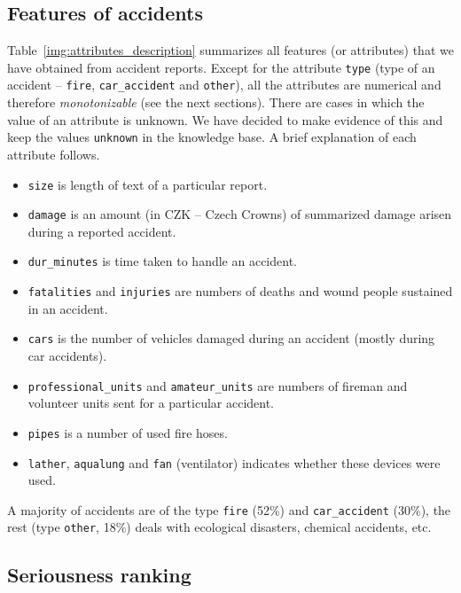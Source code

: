 \subsection{Features of accidents} \label{sec:features}


Table~\ref{img:attributes_description} summarizes all features (or attributes) that we have obtained from accident reports. Except for the attribute \verb+type+ (type of an accident -- \verb+fire+, \verb+car_accident+ and \verb+other+), all the attributes are numerical and therefore \emph{monotonizable} (see the next sections). There are cases in which the value of an attribute is unknown. We have decided to make evidence of this and keep the values \verb+unknown+ in the knowledge base. A brief explanation of each attribute follows.
\begin{itemize}
	\item \verb+size+ is length of text of a particular report.
	\item \verb+damage+ is an amount (in CZK -- Czech Crowns) of summarized damage arisen during a reported accident.
	\item \verb+dur_minutes+ is time taken to handle an accident.
	\item \verb+fatalities+ and \verb+injuries+ are numbers of deaths and wound people sustained in an accident.
	\item \verb+cars+ is the number of vehicles damaged during an accident (mostly during car accidents).
	\item \verb+professional_units+ and \verb+amateur_units+ are numbers of fireman and volunteer units sent for a particular accident.
	\item \verb+pipes+ is a number of used fire hoses.
	\item \verb+lather+, \verb+aqualung+ and \verb+fan+ (ventilator) indicates whether these devices were used.
\end{itemize}

A majority of accidents are of the type \verb+fire+ (52\%)
and \verb+car_accident+ (30\%),
the rest (type \verb+other+, 18\%)
deals with ecological disasters, chemical accidents, etc.

\subsection{Seriousness ranking} \label{sec:seriousness}

